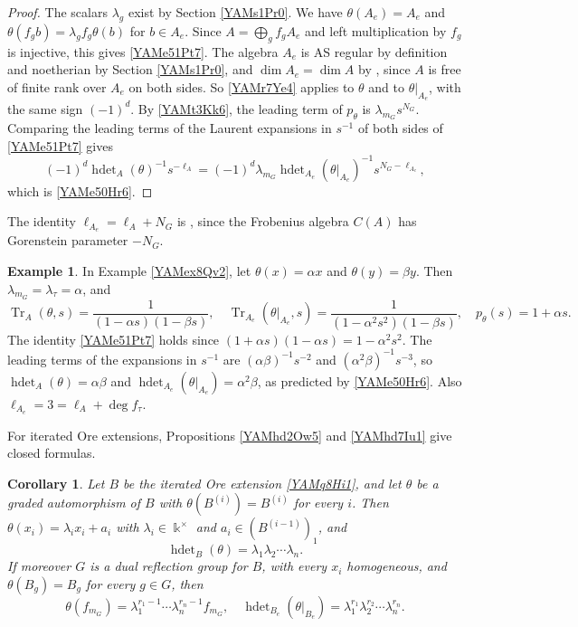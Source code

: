 \documentclass[reqno]{amsart}
\numberwithin{equation}{section}
\newtheorem{corollary}[equation]{Corollary}
\theoremstyle{definition}
\newtheorem{example}[equation]{Example}
\theoremstyle{remark}
\theoremstyle{plain}
\newcommand{\kk}{\Bbbk}
\DeclareMathOperator{\hdet}{hdet}
\DeclareMathOperator{\Tr}{Tr}
\begin{document}
\begin{proof}
The scalars $\lambda_g$ exist by Section \ref{YAMs1Pr0}. We have $\theta(A_e)=A_e$ and $\theta(f_gb)=\lambda_gf_g\theta(b)$ for $b\in A_e$. Since $A=\bigoplus_gf_gA_e$ and left multiplication by $f_g$ is injective, this gives \eqref{YAMe51Pt7}. The algebra $A_e$ is AS regular by definition and noetherian by Section \ref{YAMs1Pr0}, and $\dim A_e=\dim A$ by \cite[Lemma 3.4(1)]{KKZ}, since $A$ is free of finite rank over $A_e$ on both sides. So \eqref{YAMr7Ye4} applies to $\theta$ and to $\theta|_{A_e}$, with the same sign $(-1)^d$. By \eqref{YAMt3Kk6}, the leading term of $p_\theta$ is $\lambda_{m_G}s^{N_G}$. Comparing the leading terms of the Laurent expansions in $s^{-1}$ of both sides of \eqref{YAMe51Pt7} gives
\[
(-1)^d\hdet_A(\theta)^{-1}s^{-\ell_A}=(-1)^d\lambda_{m_G}\hdet_{A_e}(\theta|_{A_e})^{-1}s^{N_G-\ell_{A_e}},
\]
which is \eqref{YAMe50Hr6}.
\end{proof}

The identity $\ell_{A_e}=\ell_A+N_G$ is \cite[Lemma 3.4(3)]{KKZ}, since the Frobenius algebra $C(A)$ has Gorenstein parameter $-N_G$.

\begin{example}\label{YAMex6Hq8}
In Example \ref{YAMex8Qv2}, let $\theta(x)=\alpha x$ and $\theta(y)=\beta y$. Then $\lambda_{m_G}=\lambda_\tau=\alpha$, and
\[
\Tr_A(\theta,s)=\frac{1}{(1-\alpha s)(1-\beta s)},\quad\Tr_{A_e}(\theta|_{A_e},s)=\frac{1}{(1-\alpha^2s^2)(1-\beta s)},\quad p_\theta(s)=1+\alpha s.
\]
The identity \eqref{YAMe51Pt7} holds since $(1+\alpha s)(1-\alpha s)=1-\alpha^2s^2$. The leading terms of the expansions in $s^{-1}$ are $(\alpha\beta)^{-1}s^{-2}$ and $(\alpha^2\beta)^{-1}s^{-3}$, so $\hdet_A(\theta)=\alpha\beta$ and $\hdet_{A_e}(\theta|_{A_e})=\alpha^2\beta$, as predicted by \eqref{YAMe50Hr6}. Also $\ell_{A_e}=3=\ell_A+\deg f_\tau$.
\end{example}

For iterated Ore extensions, Propositions \ref{YAMhd2Ow5} and \ref{YAMhd7Iu1} give closed formulas.

\begin{corollary}\label{YAMc11Hi5}
Let $B$ be the iterated Ore extension \eqref{YAMq8Hi1}, and let $\theta$ be a graded automorphism of $B$ with $\theta(B^{(i)})=B^{(i)}$ for every $i$. Then $\theta(x_i)=\lambda_ix_i+a_i$ with $\lambda_i\in\kk^\times$ and $a_i\in(B^{(i-1)})_1$, and
\begin{equation}\label{YAMe79Hi7}
\hdet_B(\theta)=\lambda_1\lambda_2\cdots\lambda_n.
\end{equation}
If moreover $G$ is a dual reflection group for $B$, with every $x_i$ homogeneous, and $\theta(B_g)=B_g$ for every $g\in G$, then
\begin{equation}\label{YAMe80Hi8}
\theta(f_{m_G})=\lambda_1^{r_1-1}\cdots\lambda_n^{r_n-1}f_{m_G},\quad\hdet_{B_e}(\theta|_{B_e})=\lambda_1^{r_1}\lambda_2^{r_2}\cdots\lambda_n^{r_n}.
\end{equation}
\end{corollary}
\end{document}

